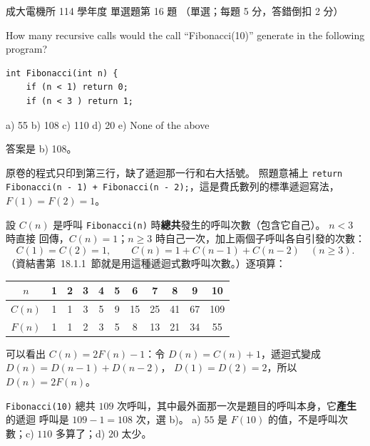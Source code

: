\begin{pastexam}[label={px:ncku-114-ee-ds-16}]{成大電機所 114 學年度 單選題第 16 題}
（單選；每題 5 分，答錯倒扣 2 分）

How many recursive calls would the call ``Fibonacci(10)'' generate in the following program?
\begin{verbatim}
int Fibonacci(int n) {
    if (n < 1) return 0;
    if (n < 3 ) return 1;
\end{verbatim}
a) 55 \quad b) 108 \quad c) 110 \quad d) 20 \quad e) None of the above
\end{pastexam}

\begin{pastsoln}
答案是 b) 108。

原卷的程式只印到第三行，缺了遞迴那一行和右大括號。 照題意補上
\texttt{return Fibonacci(n - 1) + Fibonacci(n - 2);}，這是費氏數列的標準遞迴寫法，$F(1) = F(2) = 1$。

設 $C(n)$ 是呼叫 \texttt{Fibonacci(n)} 時\textbf{總共}發生的呼叫次數（包含它自己）。 $n < 3$ 時直接
回傳，$C(n) = 1$；$n \ge 3$ 時自己一次，加上兩個子呼叫各自引發的次數：
\[
C(1) = C(2) = 1, \qquad C(n) = 1 + C(n - 1) + C(n - 2)\quad (n \ge 3).
\]
（資結書第~18.1.1~節就是用這種遞迴式數呼叫次數。）逐項算：
\begin{center}
\begin{tabular}{c*{10}{c}}
\toprule
$n$ & 1 & 2 & 3 & 4 & 5 & 6 & 7 & 8 & 9 & 10 \\
\midrule
$C(n)$ & 1 & 1 & 3 & 5 & 9 & 15 & 25 & 41 & 67 & 109 \\
$F(n)$ & 1 & 1 & 2 & 3 & 5 & 8 & 13 & 21 & 34 & 55 \\
\bottomrule
\end{tabular}
\end{center}
可以看出 $C(n) = 2F(n) - 1$：令 $D(n) = C(n) + 1$，遞迴式變成 $D(n) = D(n-1) + D(n-2)$，
$D(1) = D(2) = 2$，所以 $D(n) = 2F(n)$。

\texttt{Fibonacci(10)} 總共 $109$ 次呼叫，其中最外面那一次是題目的呼叫本身，它\textbf{產生}的遞迴
呼叫是 $109 - 1 = 108$ 次，選 b)。 a) $55$ 是 $F(10)$ 的值，不是呼叫次數；c) $110$ 多算了；d) $20$
太少。
\end{pastsoln}
